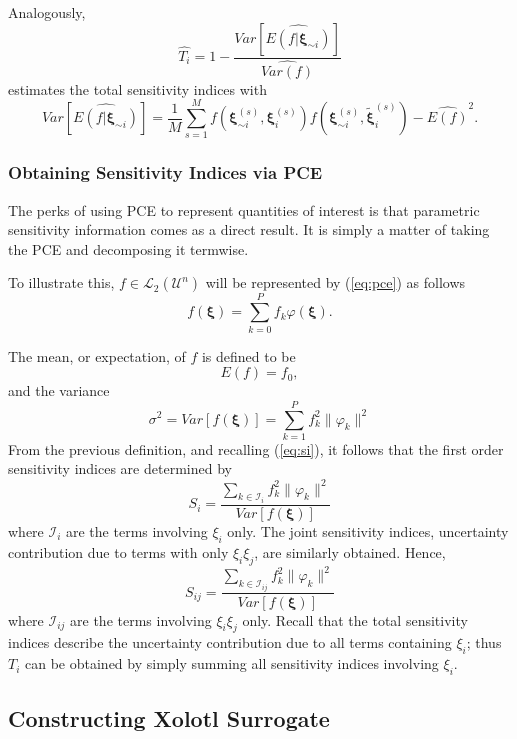 \documentclass{article}
\begin{document}
Analogously,
\begin{equation}
	\widehat{T_i} = 1 - \frac{Var[\widehat{E(f|\boldsymbol{\xi}_{\sim
	i})}]}{\widehat{Var(f)}}
\end{equation}
estimates the total sensitivity indices with
\[
	Var[\widehat{E(f|\boldsymbol{\xi}_{\sim i})}] = \frac{1}{M}
	\sum_{s=1}^M f(\boldsymbol{\xi}^{(s)}_{\sim i},\boldsymbol{\xi}^{(s)}_i)
	f(\boldsymbol{\xi}^{(s)}_{\sim i},\boldsymbol{\tilde{\xi}}^{(s)}_i) -
	\widehat{E(f)}^2  .
\]

\subsubsection{Obtaining Sensitivity Indices via PCE}

The perks of using PCE to represent quantities of interest is that parametric
sensitivity information comes as a direct result. It is simply a matter
of taking the PCE and decomposing it termwise.  

To illustrate this, $f \in \mathcal{L}_2(\mathcal{U}^n)$ will be represented by
(\ref{eq:pce}) as follows
\[
	f({\boldsymbol \xi}) = \sum_{k=0}^P f_k\varphi({\boldsymbol \xi}) .
\]

The mean, or expectation, of $f$ is defined to be 
\[
	E(f)=f_0 ,
\]
and the variance
\[
   \sigma^2 =
    Var[f({\boldsymbol \xi})] = \sum_{k=1}^P f_k^2 \| \varphi_k \|^2
\]
From the previous definition, and recalling (\ref{eq:si}), it follows that the
first order sensitivity indices are determined by
\begin{equation}
  	S_i = \frac{\sum_{k \in \mathcal{I}_i}f_k^2 \| \varphi_k
  \|^2}{Var[f({\boldsymbol \xi})]}
\end{equation}
where $\mathcal{I}_i$ are the terms involving $\xi_i$ only.
The joint sensitivity indices, uncertainty contribution due to terms
with only $\xi_i\xi_j$, are similarly obtained.  Hence,
\[
	S_{ij} = \frac{\sum_{k \in \mathcal{I}_{ij}} f_k^2 \| \varphi_k
	\|^2}{Var[f({\boldsymbol \xi})]}
\]
where $\mathcal{I}_{ij}$ are the terms involving $\xi_i\xi_j$ only.
Recall that the total sensitivity indices describe the uncertainty contribution
due to all terms containing $\xi_i$; thus $T_i$ can be obtained by simply
summing all sensitivity indices involving $\xi_i$.

\subsection{Constructing Xolotl Surrogate}
\end{document}
